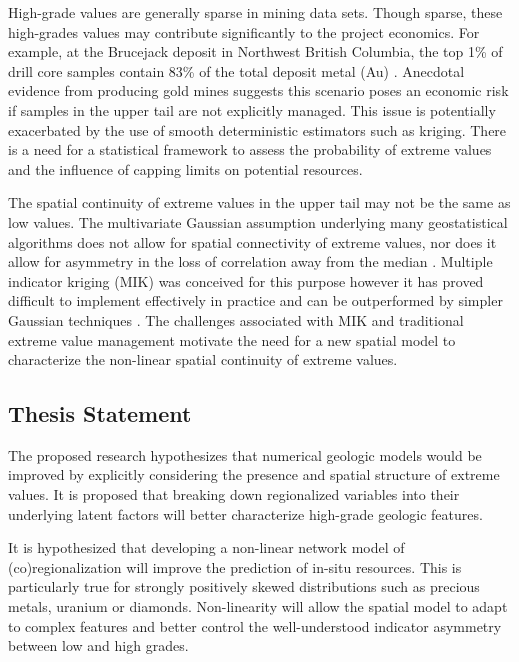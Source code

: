 High-grade values are generally sparse in mining data sets. Though sparse, these high-grades values may contribute significantly to the project economics. For example, at the Brucejack deposit in Northwest British Columbia, the top 1\% of drill core samples contain 83\% of the total deposit metal (Au) \citep{pretium2020}. Anecdotal evidence from producing gold mines suggests this scenario poses an economic risk if samples in the upper tail are not explicitly managed. This issue is potentially exacerbated by the use of smooth deterministic estimators such as kriging. There is a need for a statistical framework to assess the probability of extreme values and the influence of capping limits on potential resources.

The spatial continuity of extreme values in the upper tail may not be the same as low values. The multivariate Gaussian assumption underlying many geostatistical algorithms does not allow for spatial connectivity of extreme values, nor does it allow for asymmetry in the loss of correlation away from the median \citep{journal1989nongaussian}. Multiple indicator kriging (MIK) \citep{journel1983nonparametric} was conceived for this purpose however it has proved difficult to implement effectively in practice and can be outperformed by simpler Gaussian techniques \citep{vincent2021mik}. The challenges associated with MIK and traditional extreme value management motivate the need for a new spatial model to characterize the non-linear spatial continuity of extreme values.

\FloatBarrier
\subsection{Thesis Statement}
\label{subsec:01thesis}

The proposed research hypothesizes that numerical geologic models would be improved by explicitly considering the presence and spatial structure of extreme values. It is proposed that breaking down regionalized variables into their underlying latent factors will better characterize high-grade geologic features.

It is hypothesized that developing a non-linear network model of (co)regionalization will improve the prediction of in-situ resources. This is particularly true for strongly positively skewed distributions such as precious metals, uranium or diamonds. Non-linearity will allow the spatial model to adapt to complex features and better control the well-understood indicator asymmetry between low and high grades.

